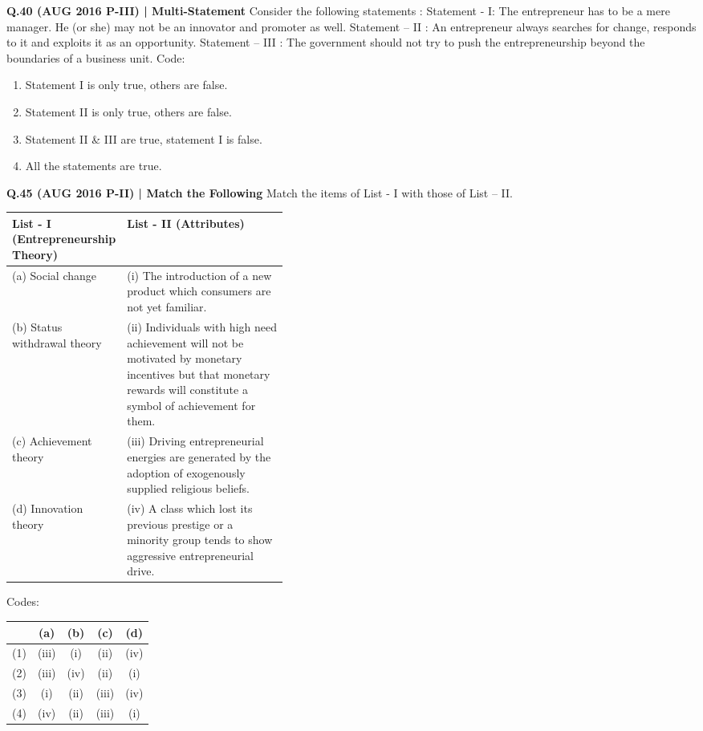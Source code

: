\documentclass{article}
\begin{document}
\textbf{Q.40 (AUG 2016 P-III) | Multi-Statement}
Consider the following statements :
Statement - I: The entrepreneur has to be a mere manager. He (or she) may not be an innovator and promoter as well.
Statement – II : An entrepreneur always searches for change, responds to it and exploits it as an opportunity.
Statement – III : The government should not try to push the entrepreneurship beyond the boundaries of a business unit.
Code:
\begin{enumerate}[label=(\arabic*)]
    \item Statement I is only true, others are false.
    \item Statement II is only true, others are false.
    \item Statement II \& III are true, statement I is false.
    \item All the statements are true.
\end{enumerate}

\textbf{Q.45 (AUG 2016 P-II) | Match the Following}
Match the items of List - I with those of List – II.
\begin{tabularx}{\linewidth}{@{} p{0.4\linewidth} X @{}}
    \toprule
    \textbf{List - I (Entrepreneurship Theory)} & \textbf{List - II (Attributes)} \\
    \midrule
    (a) Social change & (i) The introduction of a new product which consumers are not yet familiar. \\
    (b) Status withdrawal theory & (ii) Individuals with high need achievement will not be motivated by monetary incentives but that monetary rewards will constitute a symbol of achievement for them. \\
    (c) Achievement theory & (iii) Driving entrepreneurial energies are generated by the adoption of exogenously supplied religious beliefs. \\
    (d) Innovation theory & (iv) A class which lost its previous prestige or a minority group tends to show aggressive entrepreneurial drive. \\
    \bottomrule
\end{tabularx}
Codes:
\begin{tabularx}{\linewidth}{@{} l *{4}{c} @{}}
    \toprule
    & (a)   & (b)   & (c)  & (d) \\
    \midrule
    (1)   & (iii) & (i)  & (ii) & (iv) \\
    (2)   & (iii) & (iv) & (ii) & (i) \\
    (3)   & (i)   & (ii) & (iii) & (iv) \\
    (4)   & (iv)  & (ii) & (iii) & (i) \\
    \bottomrule
\end{tabularx}
\end{document}
